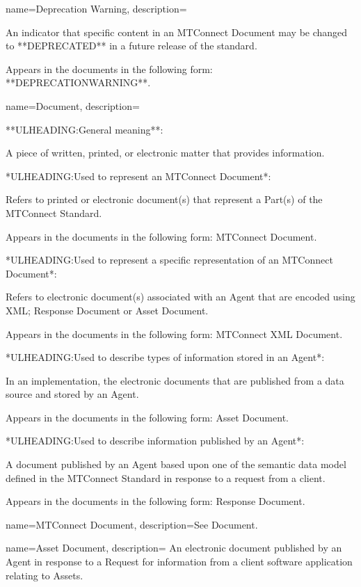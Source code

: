 {
    name={Deprecation Warning},
	description={
	An indicator that specific content in an \gls{MTConnect Document} may be changed to **DEPRECATED** in a future release of the standard.

	Appears in the documents in the following form: **DEPRECATIONWARNING**.
}
}

{
    name={Document},
	description={
	**ULHEADING:General meaning**:

	A piece of written, printed, or electronic matter that provides information.

	*ULHEADING:Used to represent an \gls{MTConnect Document}*:

	Refers to printed or electronic document(s) that represent a \gls{Part}(s) of the MTConnect Standard.

	Appears in the documents in the following form: \gls{MTConnect Document}.

	*ULHEADING:Used to represent a specific representation of an \gls{MTConnect Document}*:

	Refers to electronic document(s) associated with an \gls{Agent} that are encoded using XML; \gls{Response Document} or \gls{Asset Document}.

	Appears in the documents in the following form: \gls{MTConnect XML Document}.

	*ULHEADING:Used to describe types of information stored in an \gls{Agent}*:

	In an implementation, the electronic documents that are published from a data source and stored by an \gls{Agent}.

	Appears in the documents in the following form: \gls{Asset Document}.

	*ULHEADING:Used to describe information published by an \gls{Agent}*:

	A document published by an \gls{Agent} based upon one of the \gls{semantic data model} defined in the MTConnect Standard in response to a request from a client.  

	Appears in the documents in the following form: \gls{Response Document}.
}
}

{
    name={MTConnect Document},
	description={See \gls{Document}.}
}

{
    name={Asset Document},
	description={
	An electronic document published by an \gls{Agent} in response to a \gls{Request} for information from a client software application relating to Assets.
}
}

